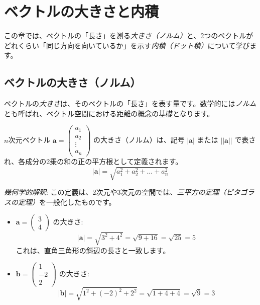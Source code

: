 \section{ベクトルの大きさと内積} \setcounter{ex}{0}

この章では、ベクトルの「長さ」を測る\emph{大きさ（ノルム）}と、2つのベクトルがどれくらい「同じ方向を向いているか」を示す\emph{内積（ドット積）}について学びます。

\subsection{ベクトルの大きさ（ノルム）}

ベクトルの\emph{大きさ}は、そのベクトルの「長さ」を表す量です。数学的には\emph{ノルム}とも呼ばれ、ベクトル空間における距離の概念の基礎となります。

\begin{dfn}
$n$次元ベクトル $\bm{a} = \begin{pmatrix} a_1 \\ a_2 \\ \vdots \\ a_n \end{pmatrix}$ の大きさ（ノルム）は、記号 $|\bm{a}|$ または $||\bm{a}||$ で表され、各成分の2乗の和の正の平方根として定義されます。
\[|\bm{a}| = \sqrt{a_1^2 + a_2^2 + \dots + a_n^2}\]
\end{dfn}

\emph{幾何学的解釈}: この定義は、2次元や3次元の空間では、\emph{三平方の定理（ピタゴラスの定理）}を一般化したものです。

\begin{ex}
\begin{itemize}
\item $\bm{a} = \begin{pmatrix} 3 \\ 4 \end{pmatrix}$ の大きさ:
    \[|\bm{a}| = \sqrt{3^2 + 4^2} = \sqrt{9 + 16} = \sqrt{25} = 5\]
    これは、直角三角形の斜辺の長さと一致します。
\item $\bm{b} = \begin{pmatrix} 1 \\ -2 \\ 2 \end{pmatrix}$ の大きさ:
    \[|\bm{b}| = \sqrt{1^2 + (-2)^2 + 2^2} = \sqrt{1 + 4 + 4} = \sqrt{9} = 3\]
\end{itemize}
\end{ex}

